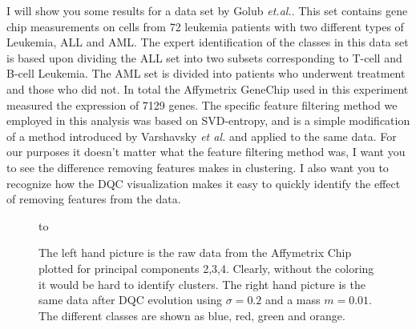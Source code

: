 \documentclass[fleqn,twoside]{article}
\begin{document}
I will show you some results for a data set by Golub {\it et.al.}\cite{golub}.
This set contains gene chip measurements on cells from 72 leukemia
patients with two different types of Leukemia, ALL and AML. The
expert identification of the classes in this data set is based upon
dividing the ALL set into two subsets corresponding to T-cell and
B-cell Leukemia.  The AML set is divided into patients who underwent
treatment and those who did not.  In total the Affymetrix GeneChip
used in this experiment measured the expression of 7129 genes. The
specific feature filtering method we employed in this analysis was
based on SVD-entropy, and is a simple modification of a method
introduced by Varshavsky {\it et al.}\cite{featsel} and applied to
the same data.  For our purposes it doesn't matter what the feature
filtering method was, I want you to see the difference removing features
makes in clustering.  I also want you to recognize how the DQC
visualization makes it easy to quickly identify the effect of
removing features from the data.
\begin{figure}[h!]
   \hbox to 
  \caption{The left hand picture is the raw data from the
  Affymetrix Chip plotted for principal components 2,3,4.
  Clearly, without the coloring it would be hard to identify
  clusters.  The right hand picture is the same data after DQC
  evolution using $\sigma =0.2$ and a mass $m=0.01$.  The different
  classes are shown as blue, red, green and orange.
   }
\label{GolubOne}
\end{figure}
\end{document}
